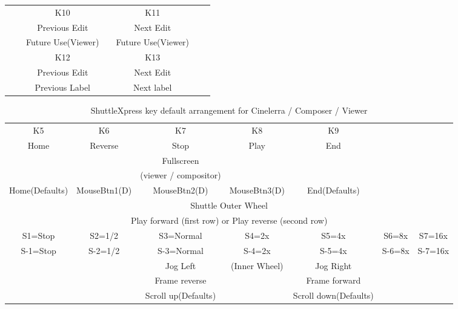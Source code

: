 \begin{landscape}
\begin{table}[htpb]
\begin{tabular}{c c c c c c c}
                      \midrule
                      & & K10  & &  K11 & & \\
                      & & Previous Edit & & Next Edit & & \\
                      & & Future Use(Viewer) & & Future Use(Viewer) & & \\
                      \midrule
                      & & K12  & &  K13 & & \\
                      & & Previous Edit & & Next Edit & & \\
                      & & Previous Label & & Next label & & \\
                      \bottomrule
        \end{tabular}
    \end{table}
\end{landscape}

\begin{landscape}   
    \begin{table}[htpb]
        \centering
        \caption{ShuttleXpress key default arrangement for Cinelerra / Composer / Viewer}
        \label{tab:xpress}
        \begin{tabular}{c c c c c c c}       
            \toprule        
            K5 & K6 & K7 & K8 & K9 & & \\
            Home & Reverse & Stop & Play & End & & \\
                 &         & Fullscreen & & & & \\
                 &         & (viewer / compositor) & & & & \\
                 \midrule
            Home(Defaults) & MouseBtn1(D) & MouseBtn2(D) & MouseBtn3(D) & End(Defaults) & & \\
            \midrule
            \multicolumn{7}{c}{Shuttle Outer Wheel} \\
            \multicolumn{7}{c}{Play forward (first row) or Play reverse (second row)} \\        
            S1=Stop &   S2=1/2 &   S3=Normal  &  S4=2x  &  S5=4x  &  S6=8x &   S7=16x \\
            S-1=Stop &  S-2=1/2 &  S-3=Normal &  S-4=2x &  S-5=4x &  S-6=8x  & S-7=16x \\
            \midrule
                     & & Jog Left & (Inner Wheel) & Jog Right & & \\ 
                     & & Frame reverse & & Frame forward & & \\
                     & & Scroll up(Defaults) & & Scroll down(Defaults) & & \\  
                     \bottomrule      
        \end{tabular}
    \end{table}
    \centering        



\end{landscape}

